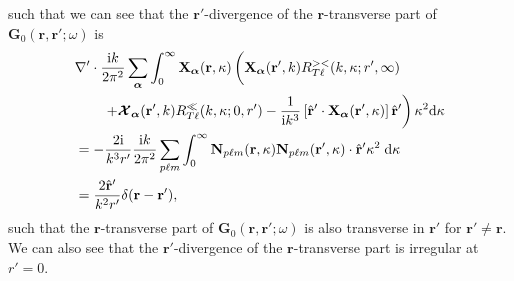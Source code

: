 \documentclass{article}
\begin{document}
such that we can see that the $\mathbf{r}'$-divergence of the $\mathbf{r}$-transverse part of $\mathbf{G}_0(\mathbf{r},\mathbf{r}';\omega)$ is 
\begin{equation}
\begin{split}
&\nabla'\cdot\frac{\mathrm{i}k}{2\pi^2}\sum_{\bm{\alpha}}\int_0^\infty\mathbf{X}_{\bm{\alpha}}(\mathbf{r},\kappa)\left( \vphantom{\frac{1}{4\pi k^2}} \mathbf{X}_{\bm{\alpha}}(\mathbf{r}',k)R_{T\ell}^{><}(k,\kappa;r',\infty)\right.\\
&\qquad\left.+ \bm{\mathcal{X}}_{\bm{\alpha}}(\mathbf{r}',k)R_{T\ell}^\ll(k,\kappa;0,r') - \frac{1}{\mathrm{i} k^3}\left[\hat{\mathbf{r}}'\cdot\mathbf{X}_{\bm{\alpha}}(\mathbf{r}',\kappa)\right]\hat{\mathbf{r}}'\right)\kappa^2\mathrm{d}\kappa\\
&= -\frac{2\mathrm{i}}{k^3r'}\frac{\mathrm{i}k}{2\pi^2}\sum_{p\ell m}\int_0^\infty\mathbf{N}_{p\ell m}(\mathbf{r},\kappa)\mathbf{N}_{p\ell m}(\mathbf{r}',\kappa)\cdot\hat{\mathbf{r}}'\kappa^2\;\mathrm{d}\kappa\\
&= \frac{2\hat{\mathbf{r}}'}{k^2r'}\delta(\mathbf{r} - \mathbf{r}'),
\end{split}
\end{equation}
such that the $\mathbf{r}$-transverse part of $\mathbf{G}_0(\mathbf{r},\mathbf{r}';\omega)$ is also transverse in $\mathbf{r}'$ for $\mathbf{r}'\neq\mathbf{r}$. We can also see that the $\mathbf{r}'$-divergence of the $\mathbf{r}$-transverse part is irregular at $r' = 0$. 
\end{document}
